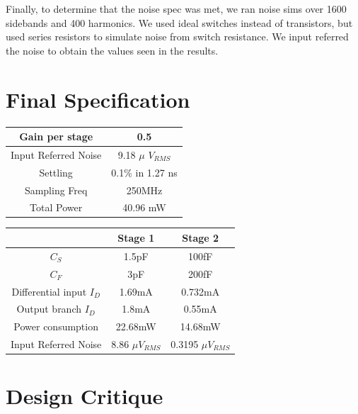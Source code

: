 \documentclass[conference]{IEEEtran}
\begin{document}
Finally, to determine that the noise spec was met, we ran noise sims over 1600 sidebands and 400 harmonics. We used ideal switches instead of transistors, but used series resistors to simulate noise from switch resistance. We input referred the noise to obtain the values seen in the results.\\

\section{Final Specification}

\begin{center}
\begin{tabular}{|c|c|} 
\hline
Gain per stage & 0.5 \\
\hline
Input Referred Noise & 9.18 $\mu$ $V_{RMS}$ \\
\hline
Settling & 0.1\% in 1.27 ns \\
\hline
Sampling Freq & 250MHz \\
\hline
Total Power & 40.96 mW \\
\hline
\end{tabular}
\end{center}


\begin{center}
\begin{tabular}{|c|c|c|} 
\hline
 & Stage 1 & Stage 2 \\
\hline
$C_S$ & 1.5pF & 100fF \\
\hline
$C_F$ & 3pF & 200fF \\
\hline
Differential input $I_D$ & 1.69mA & 0.732mA\\
\hline
Output branch $I_D$ & 1.8mA & 0.55mA\\
\hline
Power consumption & 22.68mW & 14.68mW \\
\hline
Input Referred Noise & 8.86 $\mu$$V_{RMS}$ & 0.3195 $\mu$$V_{RMS}$\\
\hline
\end{tabular}
\end{center}


\section{Design Critique}
\end{document}
